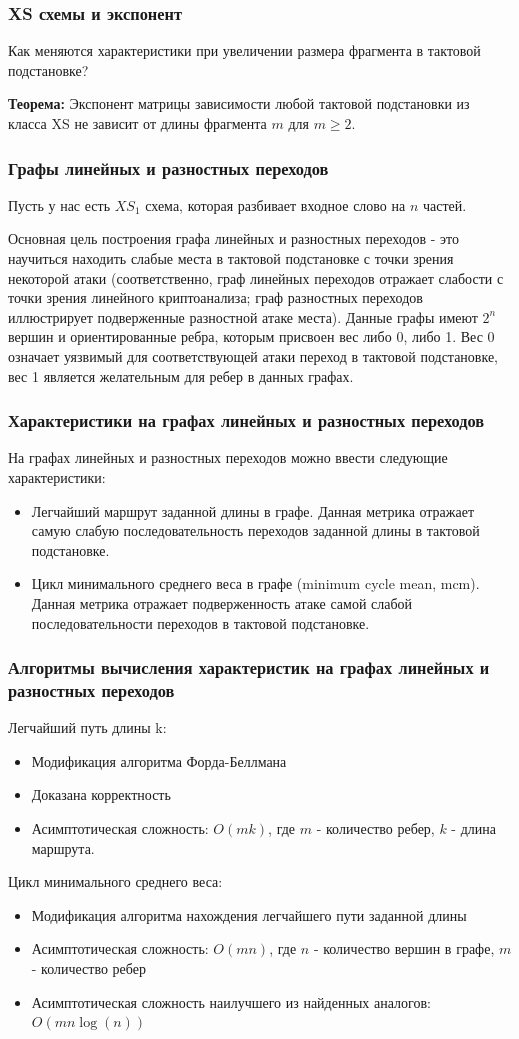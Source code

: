 \documentclass{beamer}
\begin{document}
\begin{frame}
    \frametitle{XS схемы и экспонент}
Как меняются характеристики при увеличении размера фрагмента в тактовой подстановке?

\textbf{Теорема:} Экспонент матрицы зависимости любой тактовой подстановки из класса XS не зависит от длины фрагмента $m$ для $m \ge 2$.

  \end{frame}

  \begin{frame}
    \frametitle{Графы линейных и разностных переходов}
Пусть у нас есть $XS_1$ схема, которая разбивает входное слово на $n$ частей.  

Основная цель построения графа линейных и разностных переходов - это научиться находить слабые места в тактовой подстановке с точки зрения некоторой атаки (соответственно, граф линейных переходов отражает слабости с точки зрения линейного криптоанализа; граф разностных переходов иллюстрирует подверженные разностной атаке места).
Данные графы имеют $2^n$ вершин и ориентированные ребра, которым присвоен вес либо 0, либо 1. Вес 0 означает уязвимый для соответствующей атаки переход в тактовой подстановке, вес 1 является желательным для ребер в данных графах.
  \end{frame}
\begin{frame}
 \frametitle{Характеристики на графах линейных и разностных переходов}
На графах линейных и разностных переходов можно ввести следующие характеристики:
\begin{itemize}
\item Легчайший маршрут заданной длины в графе.
Данная метрика отражает самую слабую последовательность переходов заданной длины в тактовой подстановке.
\item Цикл минимального среднего веса в графе (minimum cycle mean, mcm).
Данная метрика отражает подверженность атаке самой  слабой последовательности переходов в тактовой подстановке.
\end{itemize}
\end{frame}
\begin{frame}
\frametitle{Алгоритмы вычисления характеристик на графах линейных и разностных переходов}
Легчайший путь длины k:
\begin{itemize}
\item Модификация алгоритма Форда-Беллмана
\item Доказана корректность
\item Асимптотическая сложность: $O(mk)$, где $m$ - количество ребер, $k$ - длина маршрута.
\end{itemize}
Цикл минимального среднего веса:
\begin{itemize}
\item Модификация алгоритма нахождения легчайшего пути заданной длины
\item Асимптотическая сложность: $O(mn)$, где $n$ - количество вершин в графе, $m$ - количество ребер
\item Асимптотическая сложность наилучшего из найденных аналогов: $O(mn\log(n))$
\end{itemize}
\end{frame}
\end{document}
